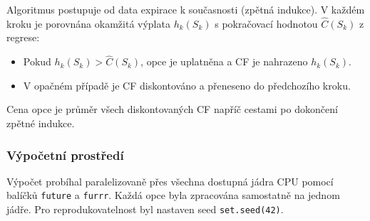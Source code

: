 Algoritmus postupuje od data expirace k současnosti (zpětná indukce). V každém kroku je porovnána okamžitá výplata \(h_k(S_k)\) s pokračovací hodnotou \(\hat{C}(S_k)\) z regrese:
\begin{itemize}
  \item Pokud \(h_k(S_k) > \hat{C}(S_k)\), opce je uplatněna a CF je nahrazeno \(h_k(S_k)\).
  \item V opačném případě je CF diskontováno a přeneseno do předchozího kroku.
\end{itemize}
Cena opce je průměr všech diskontovaných CF napříč cestami po dokončení zpětné indukce.

\subsubsection{Výpočetní prostředí}

Výpočet probíhal paralelizovaně přes všechna dostupná jádra CPU pomocí balíčků \texttt{future} a \texttt{furrr}. Každá opce byla zpracována samostatně na jednom jádře. Pro reprodukovatelnost byl nastaven seed \texttt{set.seed(42)}.
